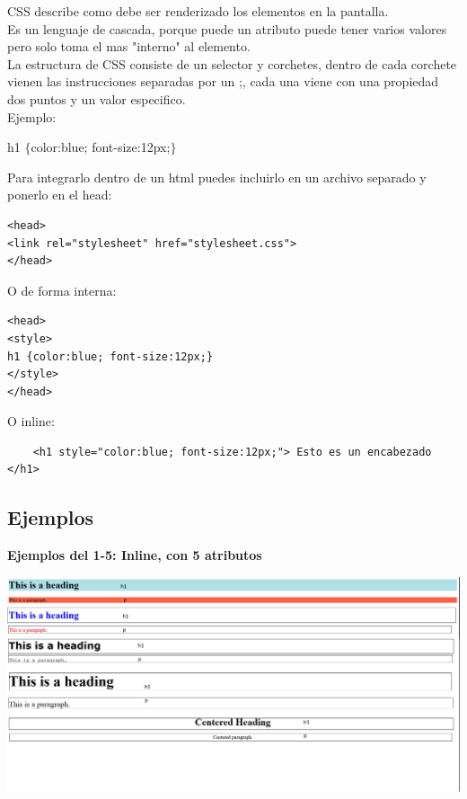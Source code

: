\documentclass[11pt]{scrartcl}
\begin{document}
CSS describe como debe ser renderizado los elementos en la pantalla. \\ 

Es un lenguaje de cascada, porque puede un atributo puede tener varios valores pero solo toma el mas "interno" al elemento. \\

La estructura de CSS consiste de un selector y corchetes, dentro de cada corchete vienen las instrucciones separadas por un ;, cada una viene con una propiedad dos puntos y un valor especifico.  \\
Ejemplo:
\begin{center}
    h1 $\{$color:blue; font-size:12px;$\}$
\end{center}


Para integrarlo dentro de un html puedes incluirlo en un archivo separado y ponerlo en el head:
\begin{lstlisting}
<head>
<link rel="stylesheet" href="stylesheet.css">
</head>
\end{lstlisting}


O de forma interna:
\begin{lstlisting}
<head>
<style>
h1 {color:blue; font-size:12px;}
</style>
</head>
\end{lstlisting}

O inline:

\begin{lstlisting}
    <h1 style="color:blue; font-size:12px;"> Esto es un encabezado </h1>
\end{lstlisting}


\subsection{Ejemplos}

\textbf{Ejemplos del 1-5: Inline, con 5 atributos } \\



\begin{center}
    \includegraphics[scale=0.4]{Ex1.png}
\end{center}
\end{document}
